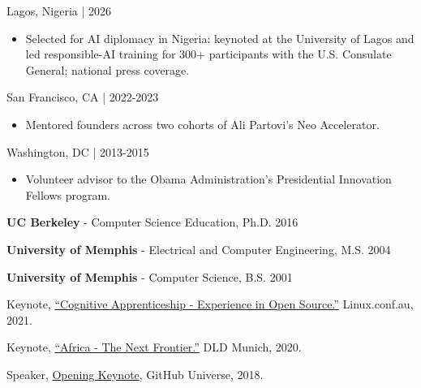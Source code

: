 \documentclass[11pt,article,oneside]{memoir}
\begin{document}
 \hfill Lagos, Nigeria | 2026
\begin{itemize}[nolistsep]
\item[-]Selected for AI diplomacy in Nigeria: keynoted at the University of Lagos and led responsible-AI training for 300+ participants with the U.S. Consulate General; national press coverage.
\end{itemize}

 \hfill San Francisco, CA | 2022-2023
\begin{itemize}[nolistsep]
\item[-]Mentored founders across two cohorts of Ali Partovi's Neo Accelerator.
\end{itemize}

 \hfill Washington, DC | 2013-2015
\begin{itemize}[nolistsep]
\item[-]Volunteer advisor to the Obama Administration's Presidential Innovation Fellows program.
\end{itemize}

\bigskip


\ind \textbf{UC Berkeley} - Computer Science Education, Ph.D. \hfill 2016

\ind \textbf{University of Memphis} - Electrical and Computer Engineering, M.S. \hfill 2004

\ind \textbf{University of Memphis} - Computer Science, B.S. \hfill 2001

\bigskip

\medskip

\ind Keynote, \href{https://www.youtube.com/watch?v=JShvXcL66NQ}{``Cognitive Apprenticeship - Experience in Open Source.''} Linux.conf.au, 2021.

\ind Keynote, \href{https://www.youtube.com/watch?v=uC5ZRaK8Ebc}{``Africa - The Next Frontier.''} DLD Munich, 2020.

\ind Speaker, \href{https://www.youtube.com/watch?v=vB5nTx5fUXM}{Opening Keynote}, GitHub Universe, 2018.
\end{document}
